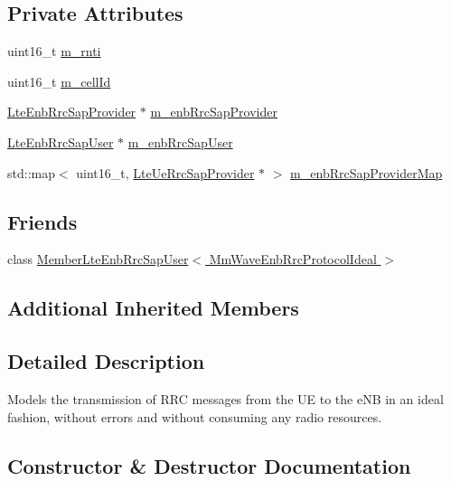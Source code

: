 \subsection*{Private Attributes}
\begin{DoxyCompactItemize}
\item 
uint16\+\_\+t \hyperlink{classns3_1_1MmWaveEnbRrcProtocolIdeal_a66b3bbef5f4a20b576e563076d2ac99e}{m\+\_\+rnti}
\item 
uint16\+\_\+t \hyperlink{classns3_1_1MmWaveEnbRrcProtocolIdeal_a12f3d627baf0e8dfe3b83ce9fcf7a2f3}{m\+\_\+cell\+Id}
\item 
\hyperlink{classns3_1_1LteEnbRrcSapProvider}{Lte\+Enb\+Rrc\+Sap\+Provider} $\ast$ \hyperlink{classns3_1_1MmWaveEnbRrcProtocolIdeal_ae19d88bfaf5f65e2e81c9127e99ef1bc}{m\+\_\+enb\+Rrc\+Sap\+Provider}
\item 
\hyperlink{classns3_1_1LteEnbRrcSapUser}{Lte\+Enb\+Rrc\+Sap\+User} $\ast$ \hyperlink{classns3_1_1MmWaveEnbRrcProtocolIdeal_a3ee58185d35507c9e660445b8b6b54ed}{m\+\_\+enb\+Rrc\+Sap\+User}
\item 
std\+::map$<$ uint16\+\_\+t, \hyperlink{classns3_1_1LteUeRrcSapProvider}{Lte\+Ue\+Rrc\+Sap\+Provider} $\ast$ $>$ \hyperlink{classns3_1_1MmWaveEnbRrcProtocolIdeal_ad21f04a15fa2b2dfa45675d177107e45}{m\+\_\+enb\+Rrc\+Sap\+Provider\+Map}
\end{DoxyCompactItemize}
\subsection*{Friends}
\begin{DoxyCompactItemize}
\item 
class \hyperlink{classns3_1_1MmWaveEnbRrcProtocolIdeal_ac2a4725532d42e0ffd6a10999363382d}{Member\+Lte\+Enb\+Rrc\+Sap\+User$<$ Mm\+Wave\+Enb\+Rrc\+Protocol\+Ideal $>$}
\end{DoxyCompactItemize}
\subsection*{Additional Inherited Members}


\subsection{Detailed Description}
Models the transmission of R\+RC messages from the UE to the e\+NB in an ideal fashion, without errors and without consuming any radio resources. 

\subsection{Constructor \& Destructor Documentation}
